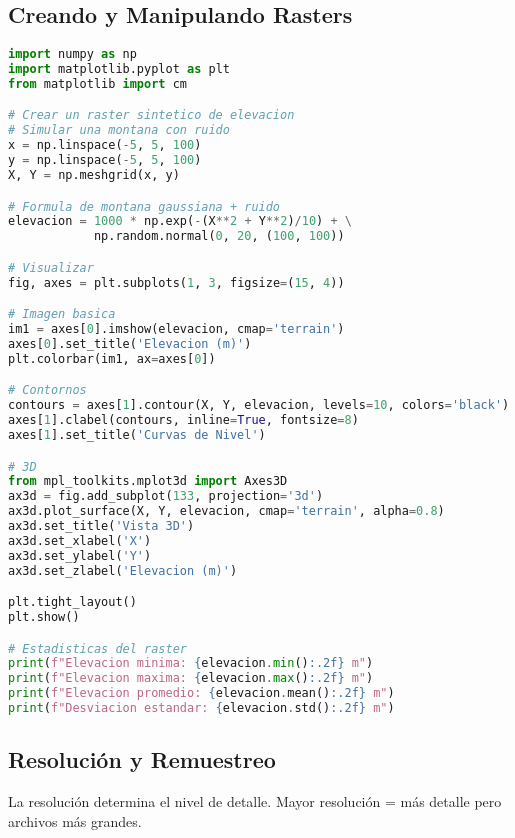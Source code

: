 \documentclass[11pt,a4paper]{article}
\begin{document}
\subsection{Creando y Manipulando Rasters}

\begin{lstlisting}[language=Python]
import numpy as np
import matplotlib.pyplot as plt
from matplotlib import cm

# Crear un raster sintetico de elevacion
# Simular una montana con ruido
x = np.linspace(-5, 5, 100)
y = np.linspace(-5, 5, 100)
X, Y = np.meshgrid(x, y)

# Formula de montana gaussiana + ruido
elevacion = 1000 * np.exp(-(X**2 + Y**2)/10) + \
            np.random.normal(0, 20, (100, 100))

# Visualizar
fig, axes = plt.subplots(1, 3, figsize=(15, 4))

# Imagen basica
im1 = axes[0].imshow(elevacion, cmap='terrain')
axes[0].set_title('Elevacion (m)')
plt.colorbar(im1, ax=axes[0])

# Contornos
contours = axes[1].contour(X, Y, elevacion, levels=10, colors='black')
axes[1].clabel(contours, inline=True, fontsize=8)
axes[1].set_title('Curvas de Nivel')

# 3D
from mpl_toolkits.mplot3d import Axes3D
ax3d = fig.add_subplot(133, projection='3d')
ax3d.plot_surface(X, Y, elevacion, cmap='terrain', alpha=0.8)
ax3d.set_title('Vista 3D')
ax3d.set_xlabel('X')
ax3d.set_ylabel('Y')
ax3d.set_zlabel('Elevacion (m)')

plt.tight_layout()
plt.show()

# Estadisticas del raster
print(f"Elevacion minima: {elevacion.min():.2f} m")
print(f"Elevacion maxima: {elevacion.max():.2f} m")
print(f"Elevacion promedio: {elevacion.mean():.2f} m")
print(f"Desviacion estandar: {elevacion.std():.2f} m")
\end{lstlisting}

\subsection{Resolución y Remuestreo}

La resolución determina el nivel de detalle. Mayor resolución = más detalle pero archivos más grandes.
\end{document}
